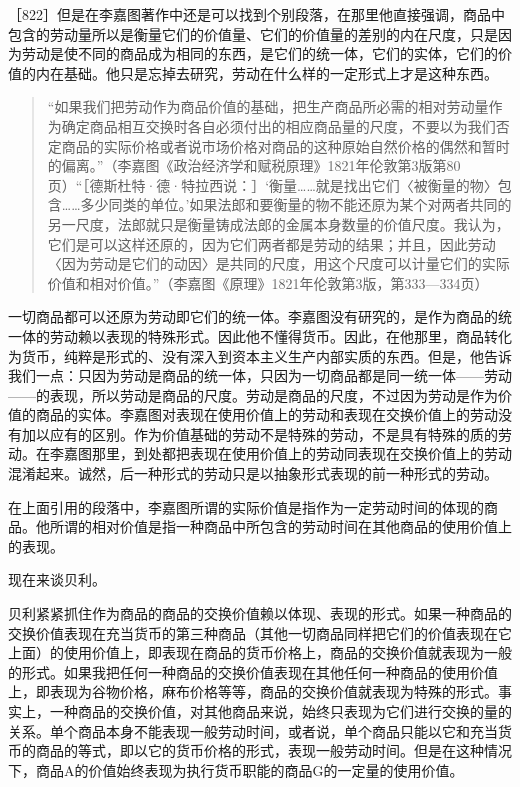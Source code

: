 ［822］但是在李嘉图著作中还是可以找到个别段落，在那里他直接强调，商品中包含的劳动量所以是衡量它们的价值量、它们的价值量的差别的内在尺度，只是因为劳动是使不同的商品成为相同的东西，是它们的统一体，它们的实体，它们的价值的内在基础。他只是忘掉去研究，劳动在什么样的一定形式上才是这种东西。

\begin{quote}{“如果我们把劳动作为商品价值的基础，把生产商品所必需的相对劳动量作为确定商品相互交换时各自必须付出的相应商品量的尺度，不要以为我们否定商品的实际价格或者说市场价格对商品的这种原始自然价格的偶然和暂时的偏离。”（李嘉图《政治经济学和赋税原理》1821年伦敦第3版第80页）“［德斯杜特·德·特拉西说：］‘衡量……就是找出它们〈被衡量的物〉包含……多少同类的单位。’如果法郎和要衡量的物不能还原为某个对两者共同的另一尺度，法郎就只是衡量铸成法郎的金属本身数量的价值尺度。我认为，它们是可以这样还原的，因为它们两者都是劳动的结果；并且，因此劳动〈因为劳动是它们的动因〉是共同的尺度，用这个尺度可以计量它们的实际价值和相对价值。”（李嘉图《原理》1821年伦敦第3版，第333—334页）}\end{quote}

一切商品都可以还原为劳动即它们的统一体。李嘉图没有研究的，是作为商品的统一体的劳动赖以表现的特殊形式。因此他不懂得货币。因此，在他那里，商品转化为货币，纯粹是形式的、没有深入到资本主义生产内部实质的东西。但是，他告诉我们一点：只因为劳动是商品的统一体，只因为一切商品都是同一统一体——劳动——的表现，所以劳动是商品的尺度。劳动是商品的尺度，不过因为劳动是作为价值的商品的实体。李嘉图对表现在使用价值上的劳动和表现在交换价值上的劳动没有加以应有的区别。作为价值基础的劳动不是特殊的劳动，不是具有特殊的质的劳动。在李嘉图那里，到处都把表现在使用价值上的劳动同表现在交换价值上的劳动混淆起来。诚然，后一种形式的劳动只是以抽象形式表现的前一种形式的劳动。

在上面引用的段落中，李嘉图所谓的实际价值是指作为一定劳动时间的体现的商品。他所谓的相对价值是指一种商品中所包含的劳动时间在其他商品的使用价值上的表现。

现在来谈贝利。

贝利紧紧抓住作为商品的商品的交换价值赖以体现、表现的形式。如果一种商品的交换价值表现在充当货币的第三种商品（其他一切商品同样把它们的价值表现在它上面）的使用价值上，即表现在商品的货币价格上，商品的交换价值就表现为一般的形式。如果我把任何一种商品的交换价值表现在其他任何一种商品的使用价值上，即表现为谷物价格，麻布价格等等，商品的交换价值就表现为特殊的形式。事实上，一种商品的交换价值，对其他商品来说，始终只表现为它们进行交换的量的关系。单个商品本身不能表现一般劳动时间，或者说，单个商品只能以它和充当货币的商品的等式，即以它的货币价格的形式，表现一般劳动时间。但是在这种情况下，商品A的价值始终表现为执行货币职能的商品G的一定量的使用价值。

